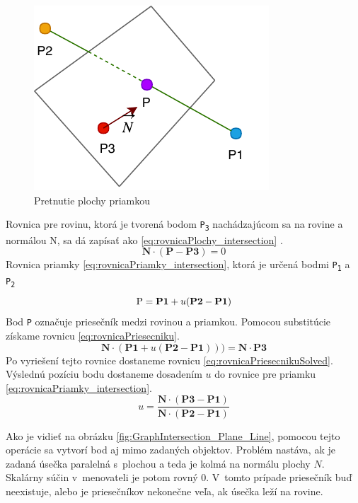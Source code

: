 \begin{figure}[H]
	\centering
	\includegraphics[height=0.3\textwidth]{obrazky-figures/DP Navrh operacii-Intersection.pdf}
	\caption{Pretnutie plochy priamkou}
	\label{fig:Intersection}
\end{figure}


Rovnica pre rovinu, ktorá je tvorená bodom \texttt{P\textsubscript{3}} nachádzajúcom sa na rovine a normálou N, sa dá zapísať ako \ref{eq:rovnicaPlochy_intersection} \cite{bourke_Point_Line_Plane}. 
\begin{equation}
    \textbf{N} \cdot (\textbf{P} - \textbf{P3}) = 0
	\label{eq:rovnicaPlochy_intersection}
\end{equation}
Rovnica priamky \ref{eq:rovnicaPriamky_intersection}, ktorá je určená bodmi \texttt{P\textsubscript{1}} a \texttt{P\textsubscript{2}}
\begin{equation}
	\textup{P}=\textbf{P1}+u (\textbf{P2}-\textbf{P1})
    \label{eq:rovnicaPriamky_intersection}
\end{equation}
Bod \texttt{P} označuje priesečník medzi rovinou a priamkou. Pomocou substitúcie získame rovnicu \ref{eq:rovnicaPriesecniku}.
\begin{equation}
	\textbf{N} \cdot (\textbf{P1}+u(\textbf{P2}-\textbf{P1}))) = \textbf{N} \cdot \textbf{P3}
    \label{eq:rovnicaPriesecniku}
\end{equation}
Po vyriešení tejto rovnice dostaneme rovnicu \ref{eq:rovnicaPriesecnikuSolved}. Výslednú pozíciu bodu dostaneme dosadením $u$ do rovnice pre  priamku \ref{eq:rovnicaPriamky_intersection}.
\begin{equation}
	u=\frac
{\textbf{N} \cdot (\textbf{P3}-\textbf{P1})}
{\textbf{N} \cdot (\textbf{P2}-\textbf{P1})}
    \label{eq:rovnicaPriesecnikuSolved}
\end{equation}


Ako je vidieť na obrázku \ref{fig:GraphIntersection_Plane_Line}, pomocou tejto operácie sa vytvorí bod aj mimo zadaných objektov. Problém nastáva, ak je zadaná úsečka paralelná s~plochou a teda je kolmá na normálu plochy $N$. Skalárny súčin v~menovateli je potom rovný 0. V~tomto prípade priesečník buď neexistuje, alebo je priesečníkov nekonečne veľa, ak úsečka leží na rovine.

